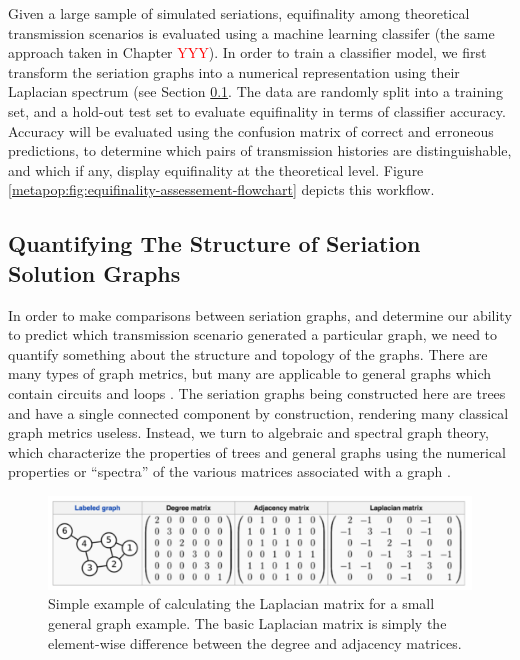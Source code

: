     Given a large sample of simulated seriations, equifinality among theoretical transmission scenarios is evaluated using a machine learning classifer (the same approach taken in Chapter \textcolor{red}{YYY}).  In order to train a classifier model, we first transform the seriation graphs into a numerical representation using their Laplacian spectrum (see Section \ref{metapop:sec:structure-seriations}.  The data are randomly split into a training set, and a hold-out test set to evaluate equifinality in terms of classifier accuracy.  Accuracy will be evaluated using the confusion matrix of correct and erroneous predictions, to determine which pairs of transmission histories are distinguishable, and which if any, display equifinality at the theoretical level.  Figure \ref{metapop:fig:equifinality-assessement-flowchart} depicts this workflow.
    
    
    \subsection{Quantifying The Structure of Seriation Solution Graphs}\label{metapop:sec:structure-seriations}
    
    In order to make comparisons between seriation graphs, and determine our ability to predict which transmission scenario generated a particular graph, we need to quantify something about the structure and topology of the graphs.  There are many types of graph metrics, but many are applicable to general graphs which contain circuits and loops \citep{chebotarev2013studying,diestel2010graph}.  The seriation graphs being constructed here are trees and have a single connected component by construction, rendering many classical graph metrics useless.  Instead, we turn to algebraic and spectral graph theory, which characterize the properties of trees and general graphs using the numerical properties or ``spectra'' of the various matrices associated with a graph \citep{banerjee2008spectrum,beineke2004topics,chung1997spectral,godsil2001algebraic}.
    
    \begin{figure}[ht]
    \centering
    \includegraphics[scale=0.35]{graphics/multipleseriation/laplacian-matrix-for-graph.pdf}
    \caption{Simple example of calculating the Laplacian matrix for a small general graph example.  The basic Laplacian matrix is simply the element-wise difference between the degree and adjacency matrices.}
    \label{metapop:fig:laplacian-example}
    \end{figure}
    
